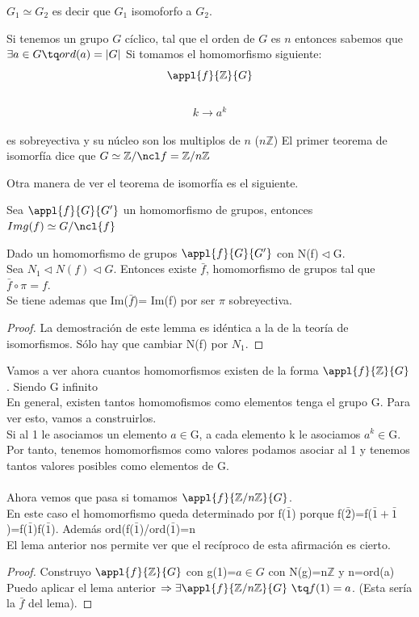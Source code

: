 \documentclass[nochap]{apuntes}
\newenvironment{notacion}[1][Notación:]{\begin{trivlist}
\item[\hskip \labelsep {\bfseries #1}]}{\end{trivlist}}
\begin{document}
\begin{notacion}
$G_1 \simeq G_2$ es decir que $G_1$ isomoforfo a $G_2$.
\end{notacion}

\begin{example}
Si tenemos un grupo $G$ cíclico, tal que el orden de $G$ es $n$ entonces sabemos que
$\exists a \in G \tq ord(a) = |G|$
Si tomamos el homomorfismo siguiente:\\
$$\appl{f}{\mathbb{Z}}{G}$$\\
$$k \longrightarrow a^k$$\\
es sobreyectiva y su núcleo son los multiplos de $n$ ($n\mathbb{Z}$)
El primer teorema de isomorfía dice que $G \simeq \mathbb{Z}/\ncl f  = \mathbb{Z}/n\mathbb{Z}$
\end{example}

Otra manera de ver el teorema de isomorfía es el siguiente.
\begin{theorem}
Sea $\appl{f}{G}{G'}$ un homomorfismo de grupos, entonces $Img(f) \simeq G/\ncl{f}$
\end{theorem}

\begin{lemma}
 Dado un homomorfismo de grupos $\appl{f}{G}{G'}$  con N(f)$\vartriangleleft$G.\\
 Sea $N_1 \vartriangleleft N(f) \vartriangleleft G$. Entonces existe $\bar{f}$, homomorfismo de grupos tal que $\bar{f}\circ\pi=f$.\\
 Se tiene ademas que Im($\bar{f}$)= Im(f) por ser $\pi$  sobreyectiva.
\end{lemma}
\begin{proof}
 La demostración de este lemma es idéntica a la de la teoría de isomorfismos. Sólo hay que cambiar N(f) por $N_1$.
\end{proof}

Vamos a ver ahora cuantos homomorfismos existen de la forma $\appl{f}{\mathbb{Z}}{G}$. Siendo G infinito\\
En general, existen tantos homomofismos como elementos tenga el grupo G. Para ver esto, vamos a construirlos.\\
Si al 1 le asociamos un elemento $a \in$G, a cada elemento k le asociamos $a^{k}\in$G. Por tanto, tenemos homomorfismos como valores
podamos asociar al 1 y tenemos tantos valores posibles como elementos de G.\\
\\
Ahora vemos que pasa si tomamos $\appl{f}{\mathbb{Z}/n\mathbb{Z}}{G}$. \\
En este caso el homomorfismo queda determinado por f($\bar{1}$) porque
f($\bar{2}$)=f($\bar{1}+\bar{1}$)=f($\bar{1}$)f($\bar{1}$). Además ord(f($\bar{1}$)/ord($\bar{1}$)=n\\
El lema anterior nos permite ver que el recíproco de esta afirmación es cierto.\\
\begin{proof}
Construyo $\appl{f}{\mathbb{Z}}{G}$  con g(1)=$a\in G$ con N(g)=n$\mathbb{Z}$  y n=ord(a)
Puedo aplicar el lema anterior $\Rightarrow \exists \appl{f}{\mathbb{Z}/n\mathbb{Z}}{G} \ \tq f(1)=a$. (Esta sería la $\bar{f}$ del lema).
\end{proof}
\end{document}
